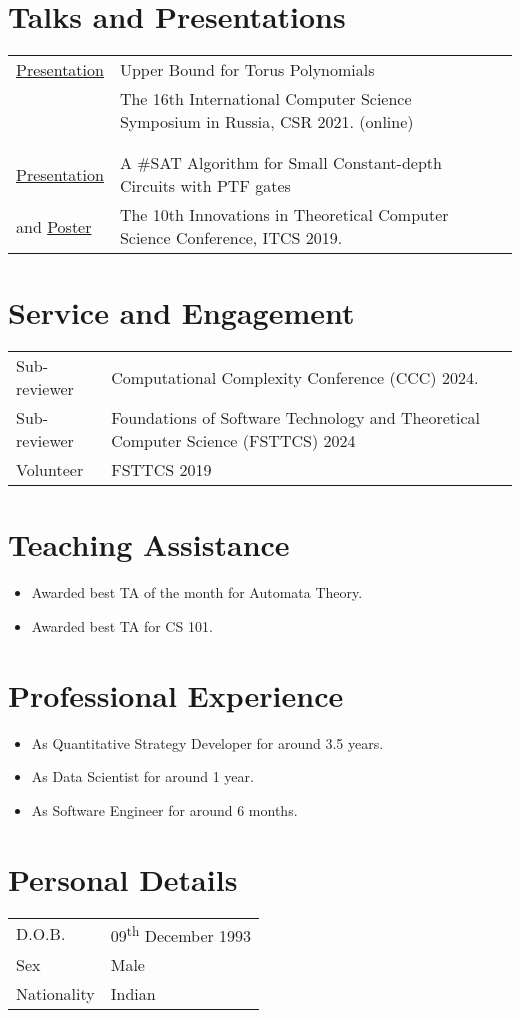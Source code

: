 \documentclass[a4paper,10pt]{article}
\begin{document}
\section{Talks and Presentations}

\begin{tabular}{p{2.5cm}|p{11cm}l}
  \href{https://vaibhkrishan.github.io/files/slides/torus.pdf}{Presentation} & Upper Bound for Torus Polynomials \\
  & The 16th International Computer Science Symposium in Russia, CSR 2021. (online) \\\multicolumn{2}{c}{} \\
  \\
  \href{https://vaibhkrishan.github.io/files/slides/ptf.pdf}{Presentation} & A \#SAT Algorithm for Small Constant-depth Circuits with PTF gates \\
  and \href{https://vaibhkrishan.github.io/files/slides/poster.pdf}{Poster} & The 10th Innovations in Theoretical Computer Science Conference, ITCS 2019.
\end{tabular}

\section{Service and Engagement}
\begin{tabular}{p{2.5cm}|p{11cm}l}
  Sub-reviewer & Computational Complexity Conference (CCC) 2024. \\
  Sub-reviewer & Foundations of Software Technology and Theoretical Computer Science (FSTTCS) 2024 \\
  Volunteer & FSTTCS 2019
\end{tabular}

\section{Teaching Assistance}

\begin{itemize}
  \item Awarded best TA of the month for Automata Theory.
  \item Awarded best TA for CS 101.
\end{itemize}

\section{Professional Experience}

\begin{itemize}
  \item As Quantitative Strategy Developer for around 3.5 years.
  \item As Data Scientist for around 1 year.
  \item As Software Engineer for around 6 months.
\end{itemize}

\section{Personal Details}

\begin{tabular}{ll}
  D.O.B. & 09\textsuperscript{th} December 1993 \\
  Sex & Male \\
  Nationality & Indian
\end{tabular}
\end{document}
